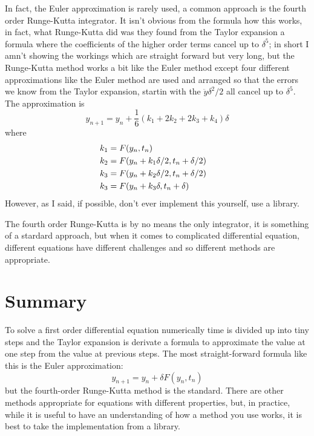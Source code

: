 \documentclass[12pt]{article}
\begin{document}
In fact, the Euler approximation is rarely used, a common approach is
the fourth order Runge-Kutta integrator. It isn't obvious from the
formula how this works, in fact, what Runge-Kutta did was they found
from the Taylor expansion a formula where the coefficients of the
higher order terms cancel up to $\delta^5$; in short I amn't showing
the workings which are straight forward but very long, but the
Runge-Kutta method works a bit like the Euler method except four
different approximations like the Euler method are used and arranged
so that the errors we know from the Taylor expansion, startin with the
$\ddot{y}\delta^2/2$ all cancel up to $\delta^5$. The approximation is
\begin{equation}
  y_{n+1}=y_n+\frac{1}{6}(k_1+2k_2+2k_3+k_4)\delta
\end{equation}
where
\begin{align}
  k_1&=F(y_n,t_n)\cr
  k_2&=F(y_n+k_1\delta/2,t_n+\delta/2)\cr
  k_3&=F(y_n+k_2\delta/2,t_n+\delta/2)\cr
  k_3&=F(y_n+k_3\delta,t_n+\delta)\
\end{align}
However, as I said, if possible, don't ever implement this yourself,
use a library.

The fourth order Runge-Kutta is by no means the only integrator, it is
something of a stardard approach, but when it comes to complicated
differential equation, different equations have different challenges
and so different methods are appropriate.

\section*{Summary}

To solve a first order differential equation numerically time is
divided up into tiny steps and the Taylor expansion is derivate a
formula to approximate the value at one step from the value at
previous steps. The most straight-forward formula like this is the Euler approximation:
\begin{equation}
  y_{n+1}=y_n+\delta F(y_n,t_n)
\end{equation}
but the fourth-order Runge-Kutta method is the standard. There are
other methods appropriate for equations with different properties,
but, in practice, while it is useful to have an understanding of how a
method you use works, it is best to take the implementation from a
library.
\end{document}
